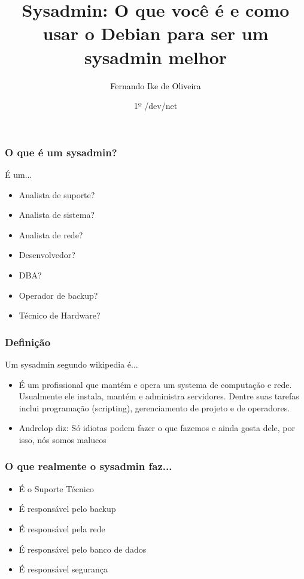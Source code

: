 \documentclass{beamer}
\title[Sysadmin: O que você é e como usar o Debian para ser um sysadmin melhor]
{%
   Sysadmin: O que você é e como usar o Debian para ser um sysadmin melhor%
}
\author[Fernando Ike de Oliveira]
{
   \textcolor{black}{Fernando Ike de Oliveira}%
}
\institute[Debian-BR]
\date[Short Occasion]
{1º /dev/net}
\begin{document}
\begin{frame}
\titlepage
\end{frame}

\begin{frame}
    \frametitle{O que é um sysadmin?}
    \begin{block}{É um...}
        \begin{itemize}
         \item Analista de suporte?
         \item Analista de sistema?
         \item Analista de rede?
         \item Desenvolvedor?
         \item DBA?
         \item Operador de backup?
         \item Técnico de Hardware?
	 \end{itemize}
    \end{block}
\end{frame}


\begin{frame}
    \frametitle{Definição}
        \begin{block}{Um sysadmin segundo wikipedia é...}
	 \begin{itemize}
	    \item É um profissional que mantém e opera um systema de computação e rede. Usualmente ele instala, mantém e administra servidores. Dentre suas tarefas inclui programação (scripting), gerenciamento de projeto e de operadores.
	    \item Andrelop diz: Só idiotas podem fazer o que fazemos e ainda gosta dele, por isso, nós somos malucos
         \end{itemize}
    \end{block}
\end{frame}

\begin{frame}
    \frametitle{O que realmente o sysadmin faz...}
        \begin{block}{ }
	 \begin{itemize}
	    \item É o Suporte Técnico
	    \item É responsável pelo backup
	    \item É responsável pela rede
	    \item É responsável pelo banco de dados
	    \item É responsável segurança
         \end{itemize}
    \end{block}
\end{frame}
\end{document}
